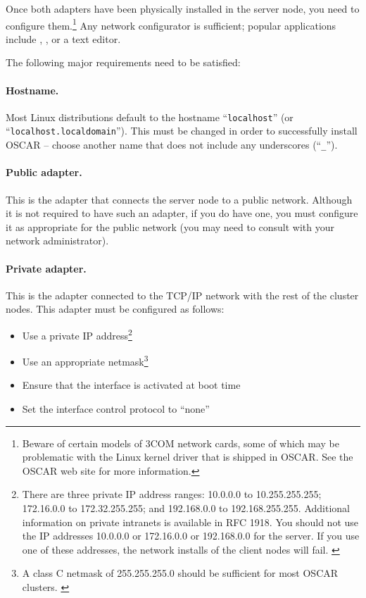 \begchange

Once both adapters have been physically installed in the server node,
you need to configure them.\footnote{Beware of certain models of 3COM
  network cards, some of which may be problematic with the Linux
  kernel driver that is shipped in OSCAR.  See the OSCAR web site for
  more information.}  Any network configurator is sufficient; popular
applications include , , or a text editor.

The following major requirements need to be satisfied:

\paragraph{Hostname.} Most Linux distributions default to the hostname
``{\tt localhost}'' (or ``{\tt localhost.localdomain}'').  This must
be changed in order to successfully install OSCAR -- choose another
name that does not include any underscores (``{\tt \_}'').

\paragraph{Public adapter.}  This is the adapter that connects the
server node to a public network.  Although it is not required to have
such an adapter, if you do have one, you must configure it as
appropriate for the public network (you may need to consult with your
network administrator).

\paragraph{Private adapter.}  This is the adapter connected to
the TCP/IP network with the rest of the cluster nodes.  This adapter
must be configured as follows:

\begin{itemize}
\item Use a private IP address\footnote{There are three private IP
    address ranges: 10.0.0.0 to 10.255.255.255; 172.16.0.0 to
    172.32.255.255; and 192.168.0.0 to 192.168.255.255.  Additional
    information on private intranets is available in RFC 1918.  You
    should not use the IP addresses 10.0.0.0 or 172.16.0.0 or
    192.168.0.0 for the server.  If you use one of these addresses,
    the network installs of the client nodes will fail.
    \label{foot:private-ip-ranges}}

\item Use an appropriate netmask\footnote{A class C netmask of
    255.255.255.0 should be sufficient for most OSCAR clusters.
    \label{foot:netmask}} 

\item Ensure that the interface is activated at boot time

\item Set the interface control protocol to ``none''

\end{itemize}

